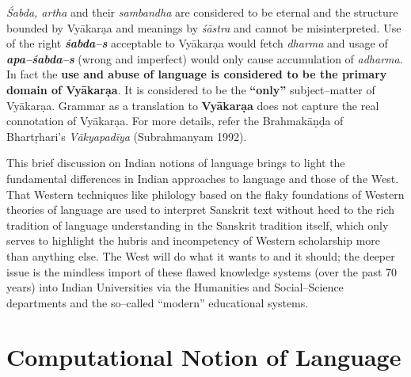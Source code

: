 \textit{Śabda, artha} and their \textit{sambandha} are considered to be eternal and the structure bounded by Vyākarạa and meanings by \textit{śāstra} and cannot be misinterpreted. Use of the right \textbf{\textit{śabda–s}} acceptable to Vyākarạa would fetch \textit{dharma} and usage of \textbf{\textit{apa–śabda–s}} (wrong and imperfect) would only cause accumulation of \textit{adharma}. In fact the \textbf{use and abuse of language is considered to be the primary domain of Vyākarạa}. It is considered to be the \textbf{“only”} subject–matter of Vyākarạa. Grammar as a translation to \textbf{Vyākarạa} does not capture the real connotation of Vyākarạa. For more details, refer the Brahmakāṇḍa of Bhartṛhari’s \textit{Vākyapadīya} (Subrahmanyam 1992).

This brief discussion on Indian notions of language brings to light the fundamental differences in Indian approaches to language and those of the West. That Western techniques like philology based on the flaky foundations of Western theories of language are used to interpret Sanskrit text without heed to the rich tradition of language understanding in the Sanskrit tradition itself, which only serves to highlight the hubris and incompetency of Western scholarship more than anything else. The West will do what it wants to and it should; the deeper issue is the mindless import of these flawed knowledge systems (over the past 70 years) into Indian Universities via the Humanities and Social–Science departments and the so–called “modern” educational systems.


\section*{Computational Notion of Language}

\vskip -6pt

